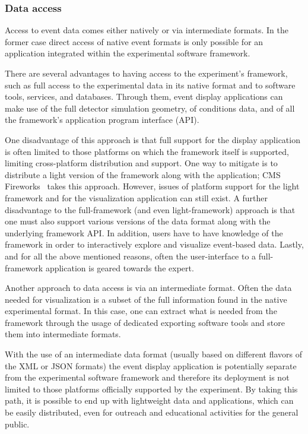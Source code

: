 \documentclass[12pt,a4paper]{article}
\begin{document}
\hypertarget{data-access}{%
\subsubsection{Data access}\label{data-access}}

Access to event data comes either natively or via intermediate formats. In the former case direct access of native event formats
is only possible for an application integrated within the experimental software framework.

There are several advantages to having access to the experiment's framework, such as full access to the experimental data in its native format and to software tools, services, and databases. Through them, event display applications can make use of the full detector simulation geometry, of conditions data, and of all the framework's application program interface (API).

One disadvantage of this approach is that full support for the display application is often limited to those platforms
on which the framework itself is supported, limiting cross-platform distribution and support.
One way to mitigate is to distribute a light version of the framework along with the application; CMS Fireworks~\cite{CMSFireworks}
takes this approach. However, issues of platform support for the light framework and for the visualization application can still exist.
A further disadvantage to the full-framework (and even light-framework) approach is that one must also support various versions of
the data format along with the underlying framework API. In addition, users have to have knowledge of the framework in order to interactively
explore and visualize event-based data. Lastly, and for all the above mentioned reasons, often the user-interface to a
full-framework application is geared towards the expert.

Another approach to data access is via an intermediate format. Often the data needed for visualization is a subset of the full information found in the native experimental format. In this case, one can extract what is needed from the framework through the usage of dedicated exporting software tools and store them
into intermediate formats.

With the use of an intermediate data format (usually based on different flavors of the XML or JSON formats) the event display application is potentially separate from the experimental software framework and therefore its deployment is not limited to those platforms officially supported by the experiment. By taking this path, it is possible to end up with lightweight data and applications, which can be easily distributed, even for outreach and educational activities for the general public. 
\end{document}
